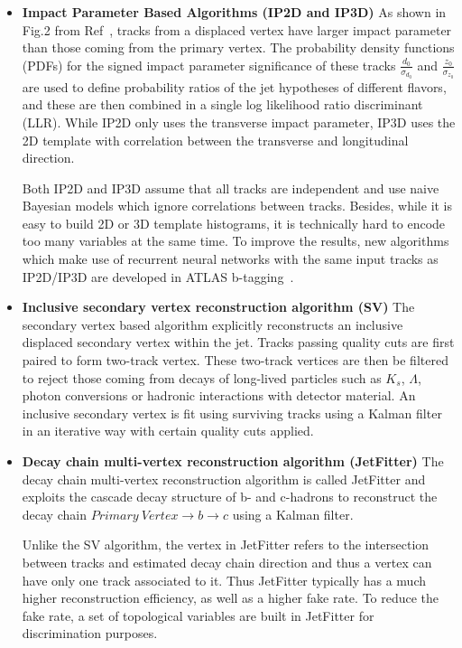 \begin{itemize}
    \item \textbf{Impact Parameter Based Algorithms (IP2D and IP3D)} As shown in Fig.2 from Ref~\cite{ATL-PHYS-PUB-2015-022}, tracks from a displaced vertex have larger impact parameter than those coming from the primary vertex. The probability density functions (PDFs) for the signed impact parameter significance of these tracks $\frac{d_0}{\sigma_{d_0}}$ and $\frac{z_0}{\sigma_{z_0}}$ are used to define probability ratios of the jet hypotheses of different flavors, and these are then combined in a single log likelihood ratio discriminant (LLR). While IP2D only uses the transverse impact parameter, IP3D uses the 2D template with correlation between the transverse and longitudinal direction. 
    \par Both IP2D and IP3D assume that all tracks are independent and use naive Bayesian models which ignore correlations between tracks. Besides, while it is easy to build 2D or 3D template histograms, it is technically hard to encode too many variables at the same time. To improve the results, new algorithms which make use of recurrent neural networks with the same input tracks as IP2D/IP3D are developed in ATLAS b-tagging~\cite{ATL-PHYS-PUB-2017-003}.
    \item \textbf{Inclusive secondary vertex reconstruction algorithm (SV)} The secondary vertex based algorithm explicitly reconstructs an inclusive displaced secondary vertex within the jet. Tracks passing quality cuts are first paired to form two-track vertex. These two-track vertices are then be filtered to reject those coming from decays of long-lived particles such as $K_s$, $\Lambda$, photon conversions or hadronic interactions with detector material. An inclusive secondary vertex is fit using surviving tracks using a Kalman filter in an iterative way with certain quality cuts applied.
    \item \textbf{Decay chain multi-vertex reconstruction algorithm (JetFitter)} The decay chain multi-vertex reconstruction algorithm is called JetFitter and exploits the cascade decay structure of b- and c-hadrons to reconstruct the decay chain $Primary\ Vertex \rightarrow b \rightarrow c$ using a Kalman filter. 
    \par Unlike the SV algorithm, the vertex in JetFitter refers to the intersection between tracks and estimated decay chain direction and thus a vertex can have only one track associated to it. Thus JetFitter typically has a much higher reconstruction efficiency, as well as a higher fake rate. To reduce the fake rate, a set of topological variables are built in JetFitter for discrimination purposes. 
\end{itemize}		

